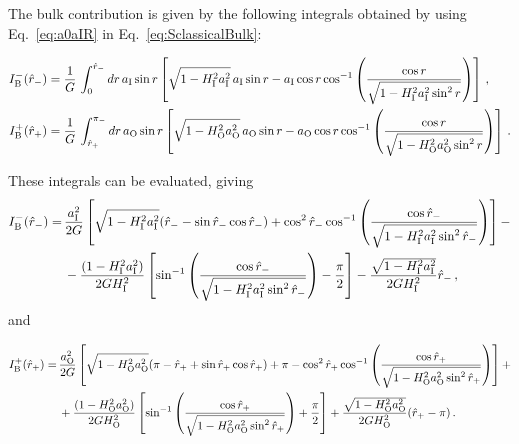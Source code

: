 \documentclass[11pt,a4paper]{article}
\begin{document}
The bulk contribution is given by the following integrals obtained
by using Eq.~\eqref{eq:a0aIR} in Eq.~\eqref{eq:SclassicalBulk}:
\begin{small}
\begin{align*}
I_{\rm B}^{-}(\hat{r}_{-}) & = \frac{1}{G} \, \int_{0}^{\hat{r}_{-}}dr\, a_{\rm I}\sin r \left[\sqrt{1 - H_{\rm I}^{2} a_{\rm I}^{2}} \, a_{\rm I} \sin r -a_{\rm I} \cos r \cos^{-1} \left(\frac{\cos r}{\sqrt{1 - H_{\rm I}^{2}a_{\rm I}^{2} \sin^{2} r}} \right) \right] \,, \\
I_{\rm B}^{+}(\hat{r}_{+}) & = \frac{1}{G} \, \int_{\hat{r}_{+}}^{\pi_{-}} dr\, a_{\rm O} \sin r \left[\sqrt{1 - H_{\rm O}^{2} a_{\rm O}^{2}} \, a_{\rm O} \sin r - a_{\rm O} \cos r \cos^{-1} \left(\frac{\cos r}{\sqrt{1 - H_{\rm O}^{2} a_{\rm O}^{2} \sin^{2} r}}\right) \right] \,.
\end{align*}
\end{small}
These integrals can be evaluated, giving  
\begin{align}
I_{\rm B}^{-}(\hat{r}_{-}) = \,& \frac{a_{\rm I}^{2}}{2G} \left[\sqrt{1 - H_{\rm I}^{2} a_{\rm I}^{2}}(\hat{r}_{-} - \sin\hat{r}_{-} \cos\hat{r}_{-}) + \cos^{2}\hat{r}_{-} \cos^{-1} \left(\frac{\cos\hat{r}_{-}}{\sqrt{1 - H_{\rm I}^{2} a_{\rm I}^{2} \sin^{2}\hat{r}_{-}}}\right)\right]\nonumber - \\
 & -\frac{(1 - H_{\rm I}^{2} a_{\rm I}^{2})}{2 G H_{\rm I}^{2}}\left[\sin^{-1}\left(\frac{\cos\hat{r}_{-}}{\sqrt{1 - H_{\rm I}^{2} a_{\rm I}^{2} \sin^{2}\hat{r}_{-}}}\right) - \frac{\pi}{2} \right] -\frac{\sqrt{1 - H_{\rm I}^{2} a_{\rm I}^{2}}}{2 G H_{\rm I}^{2}} \hat{r}_{-} \,,\label{eq:IB-}
\end{align}
and 
\begin{small}
\begin{align}
I_{\rm B}^{+}(\hat{r}_{+}) = \, & \frac{a_{\rm O}^{2}}{2G} \left[\sqrt{1 - H_{\rm O}^{2} a_{\rm O}^{2}}(\pi - \hat{r}_{+} + \sin\hat{r}_{+} \cos\hat{r}_{+}) + \pi -\cos^{2}\hat{r}_{+} \cos^{-1}\left(\frac{\cos\hat{r}_{+}}{\sqrt{1 - H_{\rm O}^{2} a_{\rm O}^{2}\sin^{2}\hat{r}_{+}}}\right)\right] +\nonumber \\
 & +\frac{(1 - H_{\rm O}^{2} a_{\rm O}^{2})}{2 G H_{\rm O}^{2}}\left[\sin^{-1}\left(\frac{\cos\hat{r}_{+}}{\sqrt{1 - H_{\rm O}^{2}a_{\rm O}^{2} \sin^{2}\hat{r}_{+}}}\right) + \frac{\pi}{2}\right] +\frac{\sqrt{1 - H_{\rm O}^{2} a_{\rm O}^{2}}}{2 G H_{\rm O}^{2}}(\hat{r}_{+} - \pi) \,.\label{eq:IB+}
\end{align}
\end{small}
\end{document}
